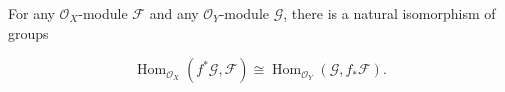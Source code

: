 For any $\mathcal{O}_X$-module $\mathcal{F}$ and any $\mathcal{O}_Y$-module $\mathcal{G}$, there is a natural isomorphism of groups

$$\operatorname{Hom}_{\mathcal{O}_X}(f^*\mathcal{G}, \mathcal{F}) \cong \operatorname{Hom}_{\mathcal{O}_Y}(\mathcal{G}, f_*\mathcal{F}).$$
